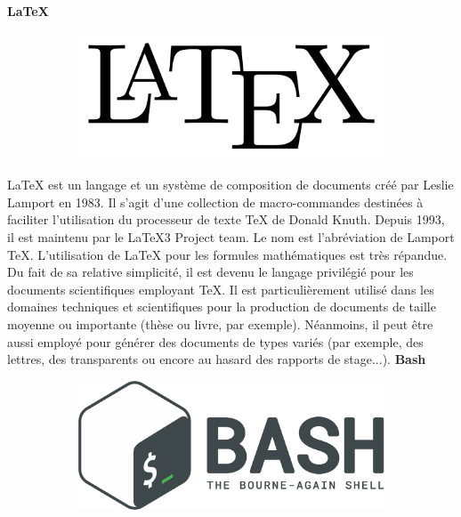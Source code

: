 \documentclass{article}
\begin{document}
\textbf{LaTeX}
\newline
\begin{figure}[h!]
	\centering
  	\begin{subfigure}[b]{0.25\linewidth}
	\includegraphics[width=\linewidth]{laTeX.png}
  	\end{subfigure}
\end{figure}

LaTeX est un langage et un système de composition de documents créé par Leslie Lamport en 1983. Il s'agit d'une collection de macro-commandes destinées à faciliter l'utilisation du processeur de texte TeX de Donald Knuth. Depuis 1993, il est maintenu par le LaTeX3 Project team. Le nom est l'abréviation de Lamport TeX. L'utilisation de LaTeX pour les formules mathématiques est très répandue.
\newline
Du fait de sa relative simplicité, il est devenu le langage privilégié pour les documents scientifiques employant TeX. Il est particulièrement utilisé dans les domaines techniques et scientifiques pour la production de documents de taille moyenne ou importante (thèse ou livre, par exemple). Néanmoins, il peut être aussi employé pour générer des documents de types variés (par exemple, des lettres, des transparents ou encore au hasard des rapports de stage...).
\newpage
\textbf{Bash}
\newline
\begin{figure}[h!]
	\centering
  	\begin{subfigure}[b]{0.25\linewidth}
	\includegraphics[width=\linewidth]{bash.png}
  	\end{subfigure}
\end{figure}
\end{document}
